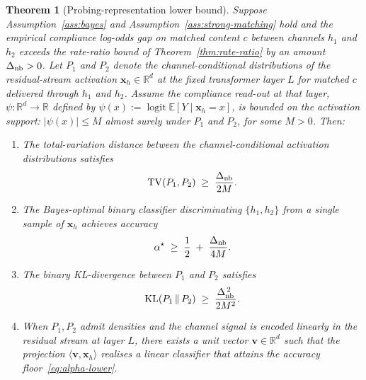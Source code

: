 \documentclass[11pt]{article}
\newtheorem{theorem}{Theorem}
\theoremstyle{definition}
\theoremstyle{remark}
\begin{document}
\begin{theorem}[Probing-representation lower bound]
\label{thm:probing}
Suppose Assumption~\ref{ass:bayes} and Assumption~\ref{ass:strong-matching} hold and
the empirical compliance log-odds gap on matched content $c$ between channels $h_1$
and $h_2$ exceeds the rate-ratio bound of Theorem~\ref{thm:rate-ratio} by an amount
$\Delta_{\textnormal{nb}} > 0$. Let $P_1$ and $P_2$ denote the channel-conditional
distributions of the residual-stream activation $\mathbf{x}_h \in \mathbb{R}^d$ at
the fixed transformer layer $L$ for matched $c$ delivered through $h_1$ and $h_2$.
Assume the compliance read-out at that layer,
$\psi : \mathbb{R}^d \to \mathbb{R}$ defined by
$\psi(x) := \operatorname{logit} \mathbb{E}[Y \mid \mathbf{x}_h = x]$, is bounded
on the activation support: $|\psi(x)| \le M$ almost surely under $P_1$ and $P_2$,
for some $M > 0$. Then:
\begin{enumerate}
\item[\textnormal{(a)}] The total-variation distance between the channel-conditional
activation distributions satisfies
\begin{equation}
\label{eq:tv-lower}
\mathrm{TV}(P_1, P_2) \;\ge\; \frac{\Delta_{\textnormal{nb}}}{2 M}.
\end{equation}
\item[\textnormal{(b)}] The Bayes-optimal binary classifier discriminating
$\{h_1, h_2\}$ from a single sample of $\mathbf{x}_h$ achieves accuracy
\begin{equation}
\label{eq:alpha-lower}
\alpha^\star \;\ge\; \frac{1}{2} \;+\; \frac{\Delta_{\textnormal{nb}}}{4 M}.
\end{equation}
\item[\textnormal{(c)}] The binary KL-divergence between $P_1$ and $P_2$ satisfies
\begin{equation}
\label{eq:kl-lower}
\mathrm{KL}(P_1 \,\|\, P_2) \;\ge\; \frac{\Delta_{\textnormal{nb}}^{\,2}}{2 M^{2}}.
\end{equation}
\item[\textnormal{(d)}] When $P_1, P_2$ admit densities and the channel signal is
encoded linearly in the residual stream at layer $L$, there exists a unit vector
$\mathbf{v} \in \mathbb{R}^{d}$ such that the projection
$\langle \mathbf{v}, \mathbf{x}_h \rangle$ realises a linear classifier that
attains the accuracy floor~\eqref{eq:alpha-lower}.
\end{enumerate}
\end{theorem}
\end{document}
